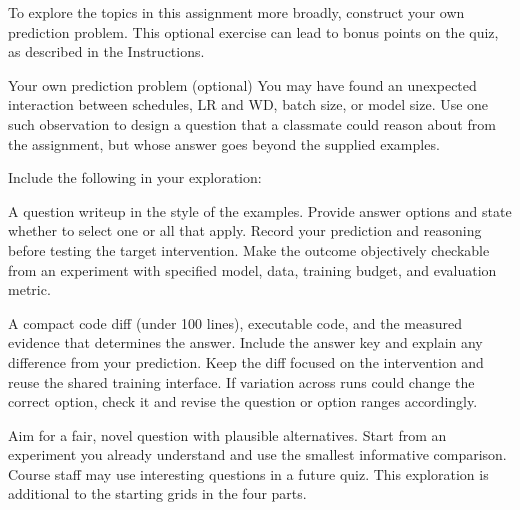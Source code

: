 \clearpage
{}

To explore the topics in this assignment more broadly, construct your own prediction
problem. This optional exercise can lead to bonus points on the quiz, as described
in the Instructions.

\begin{problem}{Your own prediction problem (optional)}
You may have found an unexpected interaction between schedules, LR and WD, batch
size, or model size. Use one such observation to design a question that a classmate
could reason about from the assignment, but whose answer goes beyond the supplied examples.

Include the following in your exploration:
\begin{parts}
\item A question writeup in the style of the examples. Provide answer options and
state whether to select one or all that apply. Record your prediction and reasoning
before testing the target intervention. Make the outcome objectively checkable from
an experiment with specified model, data, training budget, and evaluation metric.

\item A compact code diff (under 100 lines), executable code, and the measured evidence
that determines the answer. Include the answer key and explain any difference from
your prediction. Keep the diff focused on the intervention and reuse the shared training
interface. If variation across runs could change the correct option, check it and revise
the question or option ranges accordingly.
\end{parts}

Aim for a fair, novel question with plausible alternatives. Start from an experiment
you already understand and use the smallest informative comparison. Course staff may
use interesting questions in a future quiz. This exploration is additional to the
starting grids in the four parts.
\end{problem}
